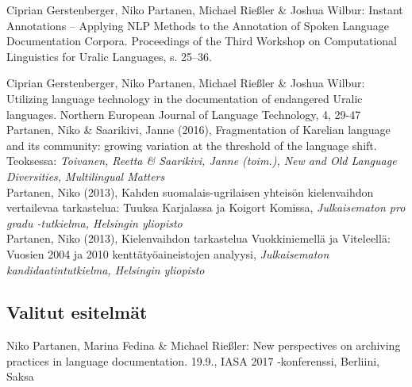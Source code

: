 \documentclass[11pt, a4paper]{article}
\newcommand{\years}[1]{\marginnote{\scriptsize #1}} %
\begin{document}
\years{2017} Ciprian Gerstenberger, Niko Partanen, Michael Rießler \& Joshua Wilbur: Instant Annotations -- Applying NLP Methods to the Annotation of Spoken Language Documentation Corpora. Proceedings of the Third Workshop on Computational Linguistics for Uralic Languages, s. 25--36.\\

\pagebreak

\years{2016} Ciprian Gerstenberger, Niko Partanen, Michael Rießler \& Joshua Wilbur: Utilizing language technology in the documentation of endangered Uralic languages. Northern European Journal of Language Technology, 4, 29-47 \\

\years{2016} Partanen, Niko \& Saarikivi, Janne (2016), Fragmentation of Karelian language and its community: growing variation at the threshold of the language shift. Teoksessa: \emph{Toivanen, Reetta \& Saarikivi, Janne (toim.), New and Old Language Diversities, Multilingual Matters}\\


\years{2013}Partanen, Niko (2013), Kahden suomalais-ugrilaisen yhteisön kielenvaihdon vertailevaa tarkastelua: Tuuksa Karjalassa ja Koigort Komissa, \emph{Julkaisematon pro gradu -tutkielma, Helsingin yliopisto}\\

\years{2013}Partanen, Niko (2013), Kielenvaihdon tarkastelua Vuokkiniemellä ja Viteleellä: Vuosien 2004 ja 2010 kenttätyöaineistojen analyysi, \emph{Julkaisematon kandidaatintutkielma, Helsingin yliopisto}\\


\subsection*{Valitut esitelmät}

\years{2017}Niko Partanen, Marina Fedina \& Michael Rießler: New perspectives on archiving practices in language documentation. 19.9., IASA 2017 -konferenssi, Berliini, Saksa\\
\end{document}
